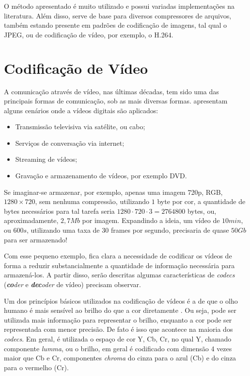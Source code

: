 \documentclass[cic,tc]{iiufrgs}
\begin{document}
O método apresentado é muito utilizado e possui variadas implementações na 
literatura.
Além disso, serve de base para diversos compressores de arquivos, também 
estando presente em padrões de codificação de imagens, tal qual o JPEG, 
ou de codificação de vídeo, por exemplo, o H.264.

\section{Codificação de Vídeo}
\label{sec:codvideo}
A comunicação através de vídeo, nas últimas décadas, tem sido uma das principais formas
de comunicação, sob as mais diversas formas.
\citet{SullivanH264} apresentam alguns cenários onde a vídeos digitais são aplicados:
\begin{itemize}
    \item Transmissão televisiva via satélite, ou cabo;
    \item Serviços de conversação via internet;
    \item Streaming de vídeos;
    \item Gravação e armazenamento de vídeos, por exemplo DVD.
\end{itemize}

Se imaginar-se armazenar, por exemplo, apenas uma imagem 720p, RGB, $1280\times720$, 
sem nenhuma compressão, utilizando $1$ byte por cor, a quantidade de bytes necessários 
para tal tarefa seria $1280\cdot720\cdot3 = 2764800$ bytes, ou, aproximadamente, $2,7Mb$
por imagem.
Expandindo a ideia, um vídeo de $10min$, ou $600s$, utilizando uma taxa de $30$ frames por segundo,
precisaria de quase $50Gb$ para ser armazenado!

Com esse pequeno exemplo, fica clara a necessidade de codificar os vídeos de forma a
reduzir substancialmente a quantidade de informação necessária para armazená-los.
A partir disso, serão descritas algumas características de \textit{codecs} 
(\emph{\textbf{co}der} e \emph{\textbf{dec}oder} de vídeo) precisam observar.

Um dos princípios básicos utilizados na codificação de vídeos é a de que o olho humano
é mais sensível ao brilho do que a cor diretamente \cite{SullivanH264}.
Ou seja, pode ser utilizada mais informação para representar o brilho, enquanto a cor
pode ser representada com menor precisão.
De fato é isso que acontece na maioria dos \emph{codecs}. 
Em geral, é utilizada o espaço de cor Y, Cb, Cr, no qual Y, chamado componente \emph{lumma},
ou o brilho, em geral é codificado com dimensão 4 vezes maior que Cb e Cr, componentes 
\emph{chroma} do cinza para o azul (Cb) e do cinza para o vermelho (Cr).
\end{document}

